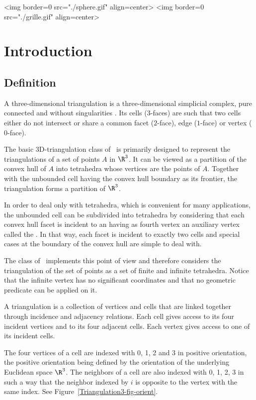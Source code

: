\begin{ccHtmlOnly}
<img border=0 src="./sphere.gif" align=center>
<img border=0 src="./grille.gif" align=center>
\end{ccHtmlOnly}
\section{Introduction}
\label{Triangulation3-sec-intro}
\subsection{Definition}
\label{Triangulation3-sec-def}
A three-dimensional triangulation is a three-dimensional simplicial
complex, pure connected and without singularities \cite{by-ag-98}. Its
cells ($3$-faces) are such that two cells either do not intersect or
share a common facet ($2$-face), edge ($1$-face) or vertex ($0$-face).

The basic 3D-triangulation class of \cgal\ is primarily designed to
represent the triangulations of a set of points $A$ in $\R^3$.  It can
be viewed as a partition of the convex hull of {$A$} into tetrahedra
whose vertices are the points of {$A$}.  Together with the unbounded
cell having the convex hull boundary as its frontier, the triangulation
forms a partition of $\R^3$.

In order to deal
only with tetrahedra, which is convenient for many applications, the
unbounded cell can be subdivided into tetrahedra by considering that
each convex hull facet is incident to an  having as
fourth vertex an auxiliary vertex called the .  In
that way, each facet is incident to exactly two cells and special cases
at the boundary of the convex hull are simple to deal with.

The class  of \cgal\ implements this
point of view and therefore considers the triangulation of the set
of points as a set of finite and infinite tetrahedra.  Notice that the
infinite vertex has no significant coordinates and that no
geometric predicate can be applied on it.

A triangulation is a collection of vertices and cells that are linked
together through incidence and adjacency relations. Each cell gives
access to its four incident vertices and to its four adjacent
cells. Each vertex gives access to one of its incident cells.

The four vertices of a cell are indexed with 0, 1, 2 and 3 in positive
orientation, the positive orientation being defined by the orientation
of the underlying Euclidean space $\R^3$. The neighbors of a cell are also
indexed with 0, 1, 2, 3 in such a way that the neighbor indexed by $i$
is opposite to the vertex with the same index. See
Figure~\ref{Triangulation3-fig-orient}.

